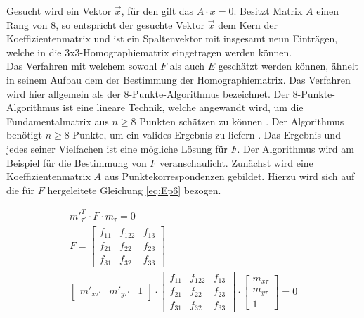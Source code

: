 Gesucht wird ein Vektor $\vec{x}$, für den gilt das $A \cdot x = 0$. Besitzt Matrix $A$ einen Rang von 8, so entspricht der gesuchte Vektor $\vec{x}$ dem Kern der Koeffizientenmatrix und ist ein Spaltenvektor mit insgesamt neun Einträgen, welche in die 3x3-Homographiematrix eingetragen werden können\cite{HZ,Schwarz}.\\


Das Verfahren mit welchem sowohl $F$ als auch $E$ geschätzt werden können, ähnelt in seinem Aufbau dem der Bestimmung der Homographiematrix. Das Verfahren wird hier allgemein als der 8-Punkte-Algorithmus bezeichnet. Der 8-Punkte-Algorithmus ist eine lineare Technik, welche angewandt wird, um die Fundamentalmatrix aus  $n \geq 8$ Punkten schätzen zu können \cite{HZ,Zhang2014,Ferid}. Der Algorithmus benötigt $n \geq 8$ Punkte, um ein valides Ergebnis zu liefern \cite{HZ,Zhang2014,Ferid}. Das Ergebnis und jedes seiner Vielfachen ist eine mögliche Lösung für $F$\cite{HZ}. Der Algorithmus wird am Beispiel für die Bestimmung von $F$ veranschaulicht. Zunächst wird eine Koeffizientenmatrix $A$ aus Punktekorrespondenzen gebildet. Hierzu wird sich auf die für $F$ hergeleitete Gleichung \ref{eq:Ep6} bezogen.


\begin{gather*}	
	{m'}_{\tau'}^T \cdot F \cdot m_\tau =0\\
	F=\begin{bmatrix}
		f_{11}&f_{122}&f_{13}\\
		f_{21}&f_{22}&f_{23}\\
		f_{31}&f_{32}&f_{33}
	\end{bmatrix}\\
	\begin{bmatrix}
		m'_{x\tau'}&m'_{y\tau'}&1
	\end{bmatrix} 
	\cdot
	\begin{bmatrix}
		f_{11}&f_{122}&f_{13}\\
		f_{21}&f_{22}&f_{23}\\
		f_{31}&f_{32}&f_{33}
	\end{bmatrix}
	\cdot
	\begin{bmatrix}
		m_{x\tau}\\m_{y\tau}\\1
	\end{bmatrix} =0
\end{gather*}

